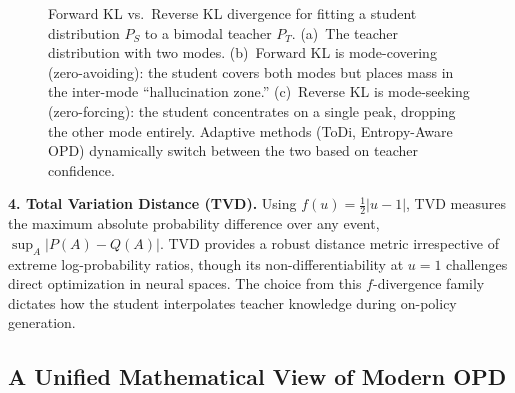 \documentclass{article} %
\begin{document}
\begin{figure}[t]
{{
}}
    \caption{Forward KL vs.\ Reverse KL divergence for fitting a student distribution $P_S$ to a bimodal teacher $P_T$. (a)~The teacher distribution with two modes. (b)~Forward KL is mode-covering (zero-avoiding): the student covers both modes but places mass in the inter-mode ``hallucination zone.'' (c)~Reverse KL is mode-seeking (zero-forcing): the student concentrates on a single peak, dropping the other mode entirely. Adaptive methods (ToDi, Entropy-Aware OPD) dynamically switch between the two based on teacher confidence.}
    \label{fig:forward_vs_reverse_kl}
\end{figure}

\textbf{4. Total Variation Distance (TVD).} Using $f(u) = \frac{1}{2}|u-1|$, TVD measures the maximum absolute probability difference over any event, $\sup_{A} |P(A) - Q(A)|$. TVD provides a robust distance metric irrespective of extreme log-probability ratios, though its non-differentiability at $u=1$ challenges direct optimization in neural spaces. The choice from this $f$-divergence family dictates how the student interpolates teacher knowledge during on-policy generation.

\subsection{A Unified Mathematical View of Modern OPD}
\label{subsec:unified_view}
\end{document}
